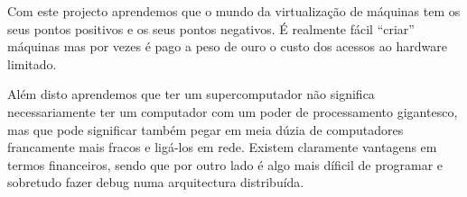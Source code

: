 \documentclass[a4paper]{article}
\begin{document}
Com este projecto aprendemos que o mundo da virtualização de máquinas tem os seus pontos positivos e os seus pontos negativos. É realmente fácil ``criar'' máquinas mas por vezes é pago a peso de ouro o custo dos acessos ao hardware limitado.

Além disto aprendemos que ter um supercomputador não significa necessariamente ter um computador com um poder de processamento gigantesco, mas que pode significar também pegar em meia dúzia de computadores francamente mais fracos e ligá-los em rede. Existem claramente vantagens em termos financeiros, sendo que por outro lado é algo mais díficil de programar e sobretudo fazer debug numa arquitectura distribuída.
\clearpage
\end{document}
